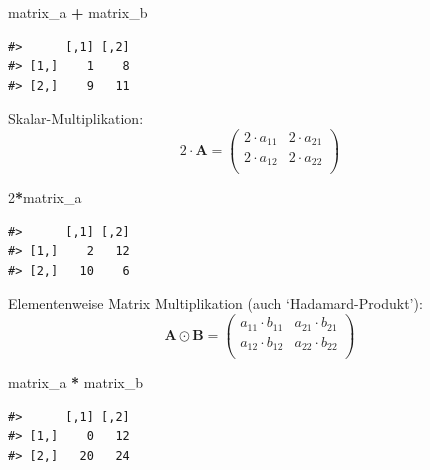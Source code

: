 \documentclass[]{book}
\newenvironment{Shaded}{\begin{snugshade}}{\end{snugshade}}
\newcommand{\DecValTok}[1]{\textcolor[rgb]{0.00,0.00,0.81}{#1}}
\newcommand{\StringTok}[1]{\textcolor[rgb]{0.31,0.60,0.02}{#1}}
\newcommand{\OperatorTok}[1]{\textcolor[rgb]{0.81,0.36,0.00}{\textbf{#1}}}
\newcommand{\NormalTok}[1]{#1}
\begin{document}
\begin{Shaded}
\begin{Highlighting}[]
\NormalTok{matrix_a }\OperatorTok{+}\StringTok{ }\NormalTok{matrix_b}
\end{Highlighting}
\end{Shaded}

\begin{verbatim}
#>      [,1] [,2]
#> [1,]    1    8
#> [2,]    9   11
\end{verbatim}

Skalar-Multiplikation: \[2\cdot\boldsymbol{A}=
\left( 
\begin{array}{rrr}                                
2\cdot a_{11} & 2\cdot a_{21} \\                                               
2\cdot a_{12} & 2\cdot a_{22} \\                                               
\end{array}
\right)\]

\begin{Shaded}
\begin{Highlighting}[]
\DecValTok{2}\OperatorTok{*}\NormalTok{matrix_a}
\end{Highlighting}
\end{Shaded}

\begin{verbatim}
#>      [,1] [,2]
#> [1,]    2   12
#> [2,]   10    6
\end{verbatim}

Elementenweise Matrix Multiplikation (auch `Hadamard-Produkt'):
\[\boldsymbol{A}\odot\boldsymbol{B}=
\left(
\begin{array}{rrr}                                
a_{11}\cdot b_{11} & a_{21}\cdot b_{21}\\                                               
a_{12}\cdot b_{12} & a_{22}\cdot b_{22}\\                                               
\end{array}
\right)\]

\begin{Shaded}
\begin{Highlighting}[]
\NormalTok{matrix_a }\OperatorTok{*}\StringTok{ }\NormalTok{matrix_b}
\end{Highlighting}
\end{Shaded}

\begin{verbatim}
#>      [,1] [,2]
#> [1,]    0   12
#> [2,]   20   24
\end{verbatim}
\end{document}
